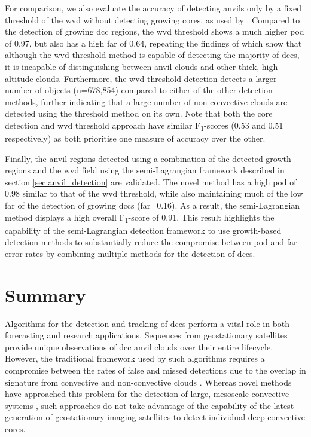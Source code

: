 For comparison, we also evaluate the accuracy of detecting anvils only by a fixed threshold of the \acrshort{wvd} without detecting growing cores, as used by \citet{muller_role_2018}.
Compared to the detection of growing \acrshort{dcc} regions, the \acrshort{wvd} threshold shows a much higher \acrshort{pod} of 0.97, but also has a high \acrshort{far} of 0.64, repeating the findings of \citet{muller_novel_2019} which show that although the \acrshort{wvd} threshold method is capable of detecting the majority of \acrshort{dcc}s, it is incapable of distinguishing between anvil clouds and other thick, high altitude clouds.
Furthermore, the \acrshort{wvd} threshold detection detects a larger number of objects (n=678,854) compared to either of the other detection methods, further indicating that a large number of non-convective clouds are detected using the threshold method on its own.
Note that both the core detection and \acrshort{wvd} threshold approach have similar F\textsubscript{1}-scores (0.53 and 0.51 respectively) as both prioritise one measure of accuracy over the other.

Finally, the anvil regions detected using a combination of the detected growth regions and the \acrshort{wvd} field using the semi-Lagrangian framework described in section \ref{sec:anvil_detection} are validated.
The novel method has a high \acrshort{pod} of 0.98 similar to that of the \acrshort{wvd} threshold, while also maintaining much of the low \acrshort{far} of the detection of growing \acrshort{dcc}s (\acrshort{far}=0.16).
As a result, the semi-Lagrangian method displays a high overall F\textsubscript{1}-score of 0.91.
This result highlights the capability of the semi-Lagrangian detection framework to use growth-based detection methods to substantially reduce the compromise between \acrshort{pod} and \acrshort{far} error rates by combining multiple methods for the detection of \acrshort{dcc}s.


\section{Summary}  %

Algorithms for the detection and tracking of \acrshort{dcc}s perform a vital role in both forecasting and research applications.
Sequences from geostationary satellites provide unique observations of \acrshort{dcc} anvil clouds over their entire lifecycle.
However, the traditional framework used by such algorithms requires a compromise between the rates of false and missed detections due to the overlap in signature from convective and non-convective clouds \citep{konduru_new_2013}.
Whereas novel methods have approached this problem for the detection of large, mesoscale convective systems \citep{fiolleau_algorithm_2013}, such approaches do not take advantage of the capability of the latest generation of geostationary imaging satellites to detect individual deep convective cores.

